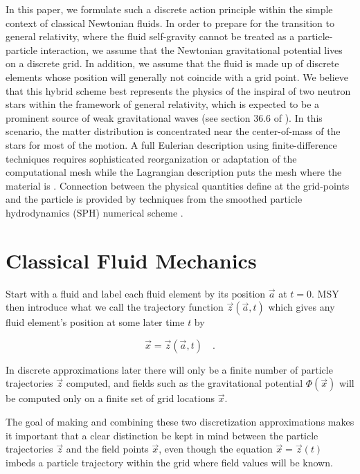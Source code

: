\documentclass{article}
\def\x{{\vec x}}
\def\z{{\vec z}}
\def\.{{\quad .}}
\begin{document}
In this paper, we formulate such a discrete action principle within the simple
context of classical Newtonian fluids.  In order to prepare for the transition
to general relativity, where the fluid self-gravity cannot be treated as a
particle-particle interaction, we assume that the Newtonian gravitational
potential lives on a discrete grid.  In addition, we assume that the fluid is
made up of discrete elements whose position will generally not coincide with
a grid point.  We believe that this hybrid scheme best represents the physics of
the inspiral of two neutron stars within the framework of general relativity,
which is expected to be a prominent source of weak gravitational waves
(see section 36.6 of \cite{B:MTW}).  In this scenario, the matter distribution
is concentrated near the center-of-mass of the stars for most of the motion.
A full Eulerian description using finite-difference techniques requires
sophisticated reorganization or adaptation of the computational mesh while
the Lagrangian description puts the mesh where the material is \cite{A:GM82}.
Connection between the physical quantities define at the grid-points and the
particle is provided by techniques from the smoothed particle hydrodynamics
(SPH) numerical scheme \cite{A:NP94,A:JJM92,A:WB89,A:GM82,A:PJM91}.

\section{Classical Fluid Mechanics}\label{cfm}

Start with a fluid and label each fluid element by its position ${\vec a}$ at
$t=0$.  MSY then introduce what we call the trajectory function
${\vec z}({\vec a},t)$ which gives any fluid element's position at some
later time $t$ by

\begin{equation}
    {\vec x} = {\vec z}({\vec a},t) \.
\end{equation}

In discrete approximations later there will only be a finite number of particle
trajectories $\z$ computed, and fields such as the gravitational potential
$\Phi(\x)$ will be computed only on a finite set of grid locations $\x$.

The goal of making and combining these two discretization approximations makes
it important that a clear distinction be kept in mind between the particle
trajectories $\z$ and the field points $\x$, even though the equation
$\x = \z(t)$ imbeds a particle trajectory within the grid where field values
will be known.
\end{document}
